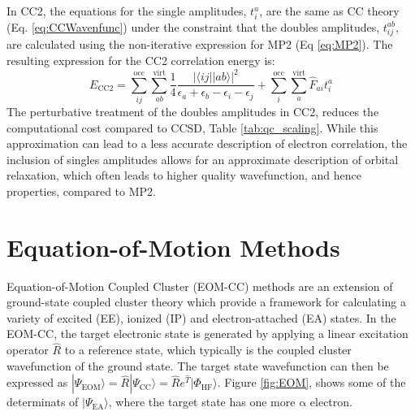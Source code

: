 In CC2, the equations for the single amplitudes, $t^a_i$, are the same as CC theory (Eq. \ref{eq:CCWavenfunc}) under the constraint that the doubles amplitudes, $t^{ab}_{ij}$, are calculated using the non-iterative expression for MP2 (Eq \ref{eq:MP2}). The resulting expression for the CC2 correlation energy is:
\begin{equation}\label{CC2Energy}
    E_{\mathrm{CC2}} = \sum_{ij}^{\mathrm{occ}} \sum_{ab}^{\mathrm{virt}} \frac{1}{4}\frac{|\langle i j || a b \rangle|^2}{\epsilon_a + \epsilon_b - \epsilon_i - \epsilon_j}  + \sum_{i}^{\mathrm{occ}} \sum_{a}^{\mathrm{virt}} \hat{F}_{ai} t^a_i 
\end{equation}
The perturbative treatment of the doubles amplitudes in CC2, reduces the computational cost compared to CCSD, Table \ref{tab:qc_scaling}. While this approximation can lead to a less accurate description of electron correlation, the inclusion of singles amplitudes allows for an approximate description of orbital relaxation, which often leads to higher quality wavefunction, and hence properties, compared to MP2.

\section{Equation-of-Motion Methods} \label{sec:eom_theory}
Equation-of-Motion Coupled Cluster (EOM-CC) methods are an extension of ground-state coupled cluster theory which provide a framework for calculating a variety of excited (EE), ionized (IP) and electron-attached (EA) states. In the EOM-CC, the target electronic state is generated by applying a linear excitation operator $\hat{R}$ to a reference state, which typically is the coupled cluster wavefunction of the ground state. The target state wavefunction can then be expressed as $|\Psi_{\mathrm{EOM}}\rangle = \hat{R} |\Psi_{\mathrm{CC}}\rangle = \hat{R} e^{\hat{T}} |\Phi_{\mathrm{HF}}\rangle$. Figure \ref{fig:EOM}, shows some of the determinats of $| \Psi_{\mathrm{EA}} \rangle$, where the target state has one more $\mathrm{\alpha}$ electron. \\

